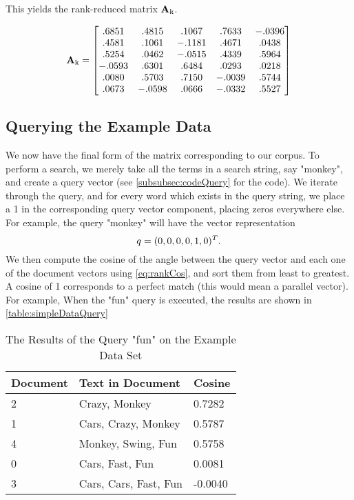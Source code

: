 This yields the rank-reduced matrix $\operatorname{\mathbf{A}_k}$.

\begin{equation}\label{eq:matSVD}
\operatorname{\mathbf{A}_k}=
    \begin{bmatrix}
    .6851 & .4815 & .1067 & .7633 & -.0396 \\
    .4581 & .1061 & -.1181 & .4671 & .0438 \\ 
    .5254 & .0462 & -.0515 & .4339 & .5964 \\
    -.0593 & .6301 & .6484 & .0293 & .0218 \\
    .0080 &  .5703 & .7150 & -.0039 & .5744 \\
    .0673 & -.0598 & .0666 & -.0332 & .5527 \\
    \end{bmatrix}
\end{equation}

\subsection{Querying the Example Data}\label{subsec:queryingTestData}

We now have the final form of the matrix corresponding to our corpus. To perform a search, we merely take all the terms in a search string, say "monkey", and create a query vector (see \autoref{subsubsec:codeQuery} for the code). We iterate through the query, and for every word which exists in the query string, we place a 1 in the corresponding query vector component, placing zeros everywhere else. For example, the query "monkey" will have the vector representation
\begin{equation}
    q = (0, 0, 0, 0, 1, 0)^T. \notag
\end{equation}
We then compute the cosine of the angle between the query vector and each one of the document vectors using \autoref{eq:rankCos}, and sort them from least to greatest. A cosine of 1 corresponds to a perfect match (this would mean a parallel vector).
For example, When the "fun" query is executed, the results are shown in \autoref{table:simpleDataQuery}

\begin{table}[h]
\centering
\begin{tabular}{| l | l | l |}
\hline
\textbf{Document} & \textbf{Text in Document} & \textbf{Cosine}  \\ \hline
2        & Crazy, Monkey & 0.7282 \\ \hline
1 & Cars, Crazy, Monkey & 0.5787 \\ \hline
4 & Monkey, Swing, Fun & 0.5758 \\ \hline
0 & Cars, Fast, Fun & 0.0081 \\ \hline
3 & Cars, Cars, Fast, Fun & -0.0040 \\ \hline
\end{tabular}
\caption{The Results of the Query "fun" on the Example Data Set}
\label{table:simpleDataQuery}
\vspace{-4mm}
\end{table}


